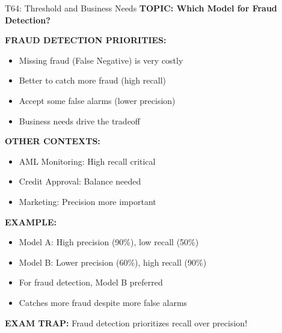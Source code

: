 \documentclass[8pt]{beamer}
\begin{document}
	\begin{frame}{T64: Threshold and Business Needs}
		\fontsize{6.5}{7.5}\selectfont
		\textbf{TOPIC: Which Model for Fraud Detection?}
		
		\vspace{0.1cm}
		\textbf{FRAUD DETECTION PRIORITIES:}
		\begin{itemize}
			\item Missing fraud (False Negative) is very costly
			\item Better to catch more fraud (high recall)
			\item Accept some false alarms (lower precision)
			\item Business needs drive the tradeoff
		\end{itemize}
		
		\vspace{0.1cm}
		\textbf{OTHER CONTEXTS:}
		\begin{itemize}
			\item \textcolor{myblue}{AML Monitoring:} High recall critical
			\item \textcolor{myblue}{Credit Approval:} Balance needed
			\item \textcolor{myblue}{Marketing:} Precision more important
		\end{itemize}
		
		\vspace{0.1cm}
		\textbf{EXAMPLE:}
		\begin{itemize}
			\item Model A: High precision (90\%), low recall (50\%)
			\item Model B: Lower precision (60\%), high recall (90\%)
			\item For fraud detection, Model B preferred
			\item Catches more fraud despite more false alarms
		\end{itemize}
		
		\textcolor{myred}{\textbf{EXAM TRAP:}} Fraud detection prioritizes \textcolor{myblue}{recall over precision}!
	\end{frame}
	
\end{document}
